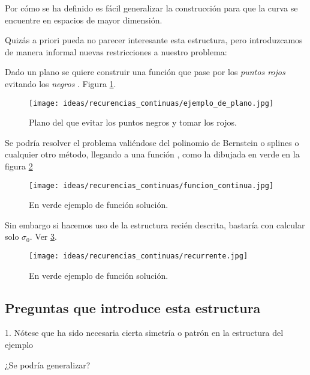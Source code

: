 Por cómo se ha definido es fácil generalizar la construcción para que la curva se encuentre en 
espacios de mayor dimensión. 

Quizás a priori pueda no parecer interesante esta estructura, pero introduzcamos 
de manera informal nuevas restricciones a nuestro problema: 

Dado un plano se quiere construir una función que pase por los \textit{puntos rojos} 
evitando los \textit{negros}
. Figura \ref{img:idea_recurrencia_plano}. 

\begin{figure}[h!]
    \texttt{[image: ideas/recurencias\_continuas/ejemplo\_de\_plano.jpg]}
    \caption{Plano del que evitar los puntos negros y tomar los rojos.}
    \label{img:idea_recurrencia_plano}
\end{figure}

Se podría resolver el problema valiéndose del polinomio de Bernstein o splines o
cualquier otro método, llegando a una función , como la dibujada en verde en la
figura \ref{img:idea_recurrencia_funcion_verde}

\begin{figure}[h!]
    \texttt{[image: ideas/recurencias\_continuas/funcion\_continua.jpg]}
    \caption{En verde ejemplo de función solución.}
    \label{img:idea_recurrencia_funcion_verde}
\end{figure} 

Sin embargo si hacemos uso de la estructura recién descrita, bastaría con 
calcular solo $\sigma_0$.
 Ver \ref{img:idea_recurrencia_sigma_cero}.  

\begin{figure}[h!]
    \texttt{[image: ideas/recurencias\_continuas/recurrente.jpg]}
    \caption{En verde ejemplo de función solución.}
    \label{img:idea_recurrencia_sigma_cero}
\end{figure} 


\subsection{ Preguntas que introduce esta estructura}

1. Nótese que ha sido necesaria cierta simetría o patrón en la estructura del ejemplo  

¿Se podría generalizar?   

